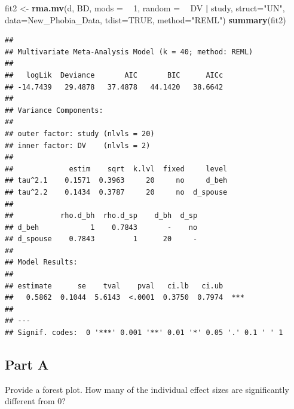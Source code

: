 \documentclass[]{article}
\newenvironment{Shaded}{\begin{snugshade}}{\end{snugshade}}
\newcommand{\KeywordTok}[1]{\textcolor[rgb]{0.13,0.29,0.53}{\textbf{#1}}}
\newcommand{\DataTypeTok}[1]{\textcolor[rgb]{0.13,0.29,0.53}{#1}}
\newcommand{\DecValTok}[1]{\textcolor[rgb]{0.00,0.00,0.81}{#1}}
\newcommand{\StringTok}[1]{\textcolor[rgb]{0.31,0.60,0.02}{#1}}
\newcommand{\OtherTok}[1]{\textcolor[rgb]{0.56,0.35,0.01}{#1}}
\newcommand{\OperatorTok}[1]{\textcolor[rgb]{0.81,0.36,0.00}{\textbf{#1}}}
\newcommand{\NormalTok}[1]{#1}
\begin{document}
\begin{Shaded}
\begin{Highlighting}[]
\NormalTok{fit2 <-}\StringTok{ }\KeywordTok{rma.mv}\NormalTok{(d, BD, }\DataTypeTok{mods =} \OperatorTok{~}\StringTok{ }\DecValTok{1}\NormalTok{, }\DataTypeTok{random =} \OperatorTok{~}\StringTok{ }\NormalTok{DV }\OperatorTok{|}\StringTok{ }\NormalTok{study, }\DataTypeTok{struct=}\StringTok{"UN"}\NormalTok{, }\DataTypeTok{data=}\NormalTok{New_Phobia_Data, }\DataTypeTok{tdist=}\OtherTok{TRUE}\NormalTok{, }\DataTypeTok{method=}\StringTok{"REML"}\NormalTok{)}
\KeywordTok{summary}\NormalTok{(fit2)}
\end{Highlighting}
\end{Shaded}

\begin{verbatim}
## 
## Multivariate Meta-Analysis Model (k = 40; method: REML)
## 
##   logLik  Deviance       AIC       BIC      AICc 
## -14.7439   29.4878   37.4878   44.1420   38.6642   
## 
## Variance Components:
## 
## outer factor: study (nlvls = 20)
## inner factor: DV    (nlvls = 2)
## 
##             estim    sqrt  k.lvl  fixed     level 
## tau^2.1    0.1571  0.3963     20     no     d_beh 
## tau^2.2    0.1434  0.3787     20     no  d_spouse 
## 
##           rho.d_bh  rho.d_sp    d_bh  d_sp 
## d_beh            1    0.7843       -    no 
## d_spouse    0.7843         1      20     - 
## 
## Model Results:
## 
## estimate      se    tval    pval   ci.lb   ci.ub 
##   0.5862  0.1044  5.6143  <.0001  0.3750  0.7974  *** 
## 
## ---
## Signif. codes:  0 '***' 0.001 '**' 0.01 '*' 0.05 '.' 0.1 ' ' 1
\end{verbatim}

\subsection{Part A}\label{part-a-1}

Provide a forest plot. How many of the individual effect sizes are
significantly different from 0?

\begin{Shaded}
\end{Shaded}
\end{document}
